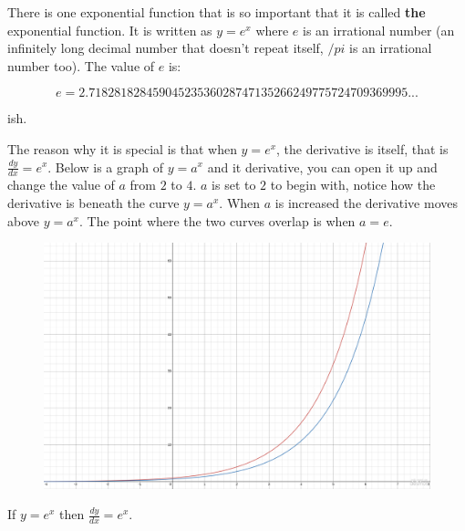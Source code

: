 \documentclass[
  a4paper,
]{scrbook}
\begin{document}
There is one exponential function that is so important that it is called
\textbf{the} exponential function. It is written as \(y=e^x\) where
\(e\) is an irrational number (an infinitely long decimal number that
doesn't repeat itself, \(/pi\) is an irrational number too). The value
of \(e\) is:

\[
e = 2.71828182845904523536028747135266249775724709369995...
\]

ish.

The reason why it is special is that when \(y=e^x\), the derivative is
itself, that is \(\frac{dy}{dx}=e^x\). Below is a graph of \(y=a^x\) and
it derivative, you can open it up and change the value of \(a\) from
\(2\) to \(4\). \(a\) is set to \(2\) to begin with, notice how the
derivative is beneath the curve \(y=a^x\). When \(a\) is increased the
derivative moves above \(y=a^x\). The point where the two curves overlap
is when \(a=e\).

\begin{figure}

{\centering 

\href{https://www.desmos.com/calculator/uxvmkixg70?embed}{\includegraphics{./10-exponetial_function_files/figure-pdf/unnamed-chunk-2-1.png}}

}

\end{figure}

\begin{tcolorbox}[enhanced jigsaw, opacityback=0, left=2mm, toptitle=1mm, title=\textcolor{quarto-callout-note-color}{\faInfo}\hspace{0.5em}{Note}, breakable, colbacktitle=quarto-callout-note-color!10!white, opacitybacktitle=0.6, bottomtitle=1mm, arc=.35mm, colback=white, leftrule=.75mm, bottomrule=.15mm, colframe=quarto-callout-note-color-frame, rightrule=.15mm, titlerule=0mm, toprule=.15mm, coltitle=black]
If \(y=e^x\) then \(\frac{dy}{dx}=e^x\).
\end{tcolorbox}
\end{document}
